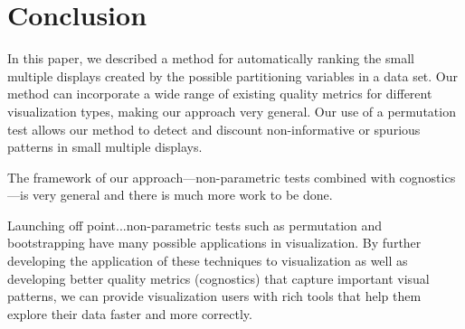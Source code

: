 \section{Conclusion}

In this paper, we described a method for automatically ranking the small multiple displays created by the possible partitioning variables in a data set. Our method can incorporate a wide range of existing quality metrics for different visualization types, making our approach very general. Our use of a permutation test allows our method to detect and discount non-informative or spurious patterns in small multiple displays.

The framework of our approach---non-parametric tests combined with cognostics---is very general and there is much more work to be done.

Launching off point...non-parametric tests such as permutation and bootstrapping have many possible applications in visualization. By further developing the application of these techniques to visualization as well as developing better quality metrics (cognostics) that capture important visual patterns, we can provide visualization users with rich tools that help them explore their data faster and more correctly.
